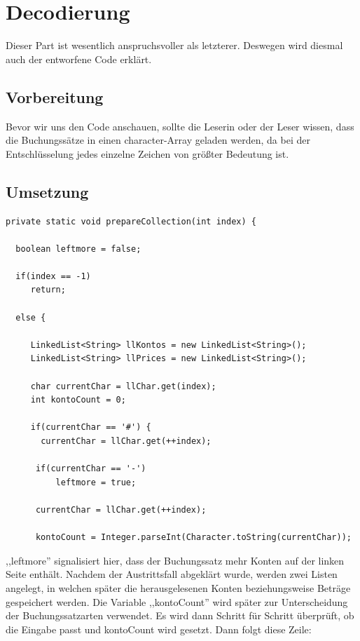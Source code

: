 \documentclass[12pt]{report}
\begin{document}
\chapter{Decodierung}
Dieser Part ist wesentlich anspruchsvoller als letzterer. Deswegen wird diesmal auch der entworfene Code erklärt.

\section{Vorbereitung}
Bevor wir uns den Code anschauen, sollte die Leserin oder der Leser wissen, dass die Buchungssätze in einen character-Array geladen werden, da bei der Entschlüsselung jedes einzelne Zeichen von größter Bedeutung ist.

\section{Umsetzung}

\begin{lstlisting}
private static void prepareCollection(int index) {
	
  boolean leftmore = false;
	
  if(index == -1)
     return;
	
  else {
		
     LinkedList<String> llKontos = new LinkedList<String>();
     LinkedList<String> llPrices = new LinkedList<String>();
		
     char currentChar = llChar.get(index);
     int kontoCount = 0;
		
     if(currentChar == '#') {
	   currentChar = llChar.get(++index);
			
	  if(currentChar == '-')
	      leftmore = true;
			
	  currentChar = llChar.get(++index);
			
	  kontoCount = Integer.parseInt(Character.toString(currentChar));
\end{lstlisting}

\noindent ,,leftmore'' signalisiert hier, dass der Buchungssatz mehr Konten auf der linken Seite enthält. Nachdem der Austrittsfall abgeklärt wurde, werden zwei Listen angelegt, in welchen später die herausgelesenen Konten beziehungsweise Beträge gespeichert werden. Die Variable ,,kontoCount'' wird später zur Unterscheidung der Buchungssatzarten verwendet. Es wird dann Schritt für Schritt überprüft, ob die Eingabe passt und kontoCount wird gesetzt. Dann folgt diese Zeile:
\end{document}
